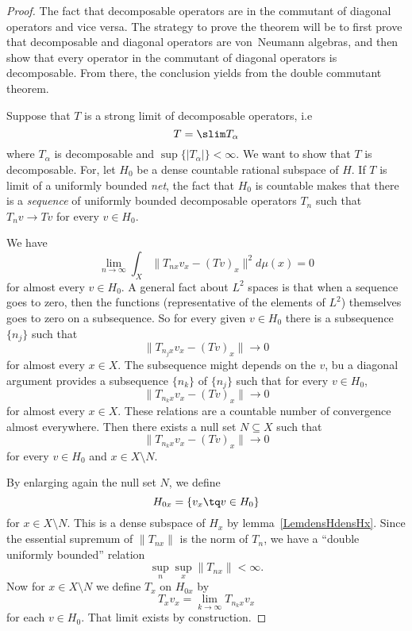 \begin{proof}
	The fact that decomposable operators are in the commutant of diagonal operators and vice versa. The strategy to prove the theorem will be to first prove that decomposable and diagonal operators are von~Neumann algebras, and then show that every operator in the commutant of diagonal operators is decomposable. From there, the conclusion yields from the double commutant theorem.

	Suppose that $T$ is a strong limit of decomposable operators, i.e
	\begin{equation}
		T=\slim T_{\alpha}
	\end{equation}
	where $T_{\alpha}$ is decomposable and $\sup\{ | T_{\alpha} | \}<\infty$.
	 We want to show that $T$ is decomposable. For, let $H_0$ be a dense countable rational subspace of $H$. If $T$ is limit of a uniformly bounded \emph{net}, the fact that $H_0$ is countable makes that there is a \emph{sequence} of uniformly bounded decomposable operators $T_n$ such that $T_nv\to Tv$ for every $v\in H_0$.

	We have
	\begin{equation}
		\lim_{n\to\infty}\int_X \| T_{nx}v_x - (Tv)_x \|^2d\mu(x)=0
	\end{equation}
	for almost every $v\in H_0$. A general fact about $L^2$ spaces is that when a sequence goes to zero, then the functions (representative of the elements of $L^2$) themselves goes to zero on a subsequence. So for every given $v\in H_0$ there is a subsequence $\{ n_j \}$ such that
	\begin{equation}
		\| T_{n_jx}v_x-(Tv)_x \|\to 0
	\end{equation}
	for almost every $x\in X$. The subsequence might depends on the $v$, bu a diagonal argument provides a subsequence $\{ n_k \}$ of $\{ n_j \}$ such that for every $v\in H_0$,
	\begin{equation}
		\| T_{n_kx}v_x-(Tv)_x \|\to 0
	\end{equation}
	for almost every $x\in X$. These relations are a countable number of convergence almost everywhere. Then there exists a null set $N\subseteq X$ such that
	\begin{equation}		\label{EqTnkxTvxHorsN}
		\| T_{n_kx}v_x-(Tv)_x \|\to 0
	\end{equation}
	for every $v\in H_0$ and $x\in X\setminus N$.

	By enlarging again the null set $N$, we define
	\begin{equation}
		H_{0x}=\{ v_x\tq v\in H_0 \}
	\end{equation}
	for $x\in X\setminus N$. This is a dense subspace of $H_x$ by lemma~\ref{LemdensHdensHx}. Since the essential supremum of $\| T_{nx} \|$ is the norm of $T_n$, we have a ``double uniformly bounded'' relation
	\begin{equation}
		\sup_n\sup_x\| T_{nx} \|<\infty.
	\end{equation}
	Now for $x\in X\setminus N$ we define $T_x$ on $H_{0x}$ by
	\begin{equation}
		T_xv_x=\lim_{k\to\infty} T_{n_kx}v_x
	\end{equation}
	for each $v\in H_0$. That limit exists by construction.


\end{proof}
